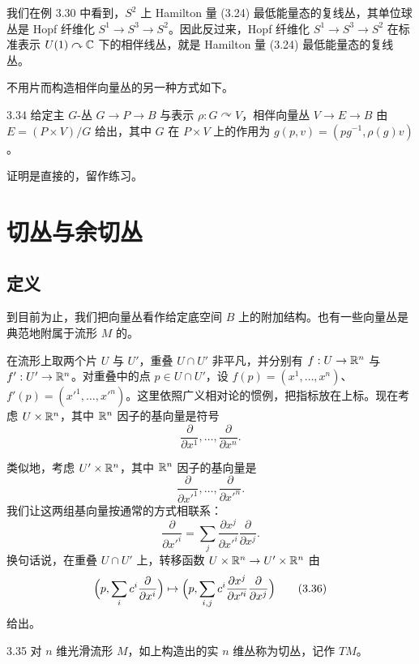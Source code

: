 我们在例 3.30 中看到，$S^2$ 上 Hamilton 量 (3.24) 最低能量态的复线丛，其单位球丛是 Hopf 纤维化 $S^1\to S^3\to S^2$。因此反过来，Hopf 纤维化 $S^1\to S^3\to S^2$ 在标准表示 $U(1)\curvearrowright\mathbb{C}$ 下的相伴线丛，就是 Hamilton 量 (3.24) 最低能量态的复线丛。

不用片而构造相伴向量丛的另一种方式如下。

\begin{proposition}{3.34}
给定主 $G$-丛 $G\to P\to B$ 与表示 $\rho:G\curvearrowright V$，相伴向量丛 $V\to E\to B$ 由 $E=(P\times V)/G$ 给出，其中 $G$ 在 $P\times V$ 上的作用为 $g(p,v)=(pg^{-1},\rho(g)v)$。
\end{proposition}

证明是直接的，留作练习。


\section{切丛与余切丛}

\subsection{定义}

到目前为止，我们把向量丛看作给定底空间 $B$ 上的附加结构。也有一些向量丛是典范地附属于流形 $M$ 的。

在流形上取两个片 $U$ 与 $U'$，重叠 $U\cap U'$ 非平凡，并分别有 $f:U\to\mathbb{R}^n$ 与 $f':U'\to\mathbb{R}^n$。对重叠中的点 $p\in U\cap U'$，设 $f(p)=(x^1,\dots,x^n)$、$f'(p)=(x'^1,\dots,x'^n)$。这里依照广义相对论的惯例，把指标放在上标。现在考虑 $U\times\mathbb{R}^n$，其中 $\mathbb{R}^n$ 因子的基向量是符号
\[
\frac{\partial}{\partial x^1},\dots,\frac{\partial}{\partial x^n}.
\tag{3.33}
\]

类似地，考虑 $U'\times\mathbb{R}^n$，其中 $\mathbb{R}^n$ 因子的基向量是
\[
\frac{\partial}{\partial x'^1},\dots,\frac{\partial}{\partial x'^n}.
\tag{3.34}
\]
我们让这两组基向量按通常的方式相联系：
\[
\frac{\partial}{\partial x'^i}=\sum_j\frac{\partial x^j}{\partial x'^i}\frac{\partial}{\partial x^j}.
\tag{3.35}
\]
换句话说，在重叠 $U\cap U'$ 上，转移函数 $U\times\mathbb{R}^n\to U'\times\mathbb{R}^n$ 由
\[
\Bigl(p,\sum_i c^i\frac{\partial}{\partial x^i}\Bigr)\mapsto\Bigl(p,\sum_{i,j}c^i\frac{\partial x^j}{\partial x'^i}\frac{\partial}{\partial x^j}\Bigr)
\tag{3.36}
\]
给出。

\begin{definition}{3.35}
对 $n$ 维光滑流形 $M$，如上构造出的实 $n$ 维丛称为切丛，记作 $TM$。
\end{definition}

